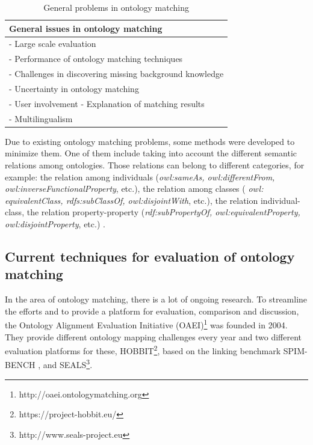 \documentclass[runningheads]{llncs}
\begin{document}
\begin{table}[h]
\caption{General problems in ontology matching \cite{Shvaiko}}\label{general_problems} 
\begin{tabular}{|p{13cm}|}
\hline
\textbf{General issues in ontology matching}\\
\hline
- Large scale evaluation\\
\hline
- Performance of ontology matching techniques
\\
\hline
- Challenges in discovering missing background knowledge	\\
\hline
- Uncertainty in ontology matching
\\
\hline
- User involvement \newline
- Explanation of matching results
\\
\hline
- Multilingualism
\\
\hline
\end{tabular}
\end{table}

 Due to existing ontology matching problems, some methods were developed to minimize them. One of them include taking into account the different semantic relations among ontologies. Those relations can belong to different categories, for example: the relation among individuals (\textit{owl:sameAs, owl:differentFrom, owl:inverseFunctionalProperty}, etc.), the relation among classes ( \textit{owl: equivalentClass, rdfs:subClassOf, owl:disjointWith}, etc.), the relation individual-class, the relation property-property (\textit{rdf:subPropertyOf, owl:equivalentProperty, \newline owl:disjointProperty}, etc.) \cite{ref_url3}.

\subsection{Current techniques for evaluation of ontology matching}

In the area of ontology matching, there is a lot of ongoing research. To streamline the efforts and to provide a platform for evaluation, comparison and discussion, the Ontology Alignment Evaluation Initiative (OAEI)\footnote{http://oaei.ontologymatching.org} was founded in 2004. They provide different ontology mapping challenges every year and two different evaluation platforms for these, HOBBIT\footnote{https://project-hobbit.eu/}, based on the linking benchmark SPIM-BENCH \cite{Saveta}, and SEALS\footnote{http://www.seals-project.eu}.
\end{document}
